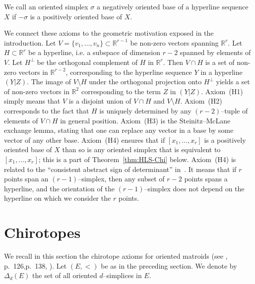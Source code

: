 \documentclass[a4paper]{amsart}
\theoremstyle{definition}
\theoremstyle{remark}
\begin{document}
We call an oriented simplex $\sigma$ a negatively oriented base of a
hyperline sequence $X$ if $-\sigma$ is a positively oriented base of
$X$.

We connect these axioms to the geometric motivation exposed in the
introduction. Let $V=\{v_1,\dots, v_n\}\subset \mathbb R^{r-1}$ be
non-zero vectors spanning $\mathbb R^{r}$. Let $H\subset \mathbb
R^{r}$ be a hyperline, i.e. a subspace of dimension $r-2$ spanned by
elements of $V$. Let $H^\perp$ be the orthogonal complement of $H$ in
$\mathbb R^{r}$.  Then $V\cap H$ is a set of non-zero vectors in
$\mathbb R^{r-2}$, corresponding to the hyperline sequence $Y$ in a
hyperline $(Y|Z)$.
%
The image of $V\setminus H$ under the orthogonal projection onto
$H^\perp$ yields a set of non-zero vectors in $\mathbb R^2$
corresponding to the term $Z$ in $(Y|Z)$.
%
Axiom~(H1) simply means that $V$ is a disjoint union of $V\cap H$ and
$V\setminus H$.  Axiom~(H2) corresponds to the fact that $H$ is
uniquely determined by any $(r-2)$--tuple of elements of $V\cap H$ in
general position.
%
Axiom~(H3) is the Steinitz--McLane exchange lemma, stating that one
can replace any vector in a base by some vector of any other base.
%
Axiom~(H4) ensures that if $[x_1,\dots ,x_r]$ is a positively
oriented base of $X$ than so is any oriented simplex that is equivalent
to $[x_1,\dots, x_r]$; this is a part of Theorem~\ref{thm:HLS-Chi} below.
Axiom~(H4) is related to the 
``consistent abstract sign of
determinant'' in~\cite{bokowskimockstreinu}. It means that if $r$
points span an $(r-1)$--simplex, then any subset of $r-2$ points spans
a hyperline, and the orientation of the $(r-1)$--simplex does not
depend on the hyperline on which we consider the $r$ points.



\section{Chirotopes}
\label{sec:chirotope}

We recall in this section the chirotope axioms for oriented matroids
(see \cite {bjorner}, p.~126,p.~138, \cite{GN}). 
Let $(E,<)$ be as in the preceding section.  We
denote by $\Delta_d(E)$ the set of all oriented $d$--simplices in $E$.
\end{document}
